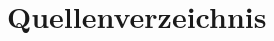 \let\LaTeXStandardClearpage\clearpage
\let\clearpage\relax  %

\chapter{Quellenverzeichnis}
\label{ch:Quellen}

\printbibliography[heading=none]

\newpage

\let\clearpage\LaTeXStandardClearpage %